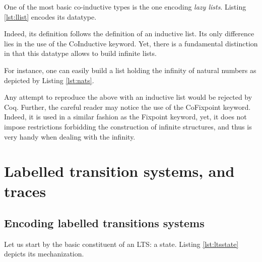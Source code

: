 	One of the most basic co-inductive types is the one encoding \textit{lazy lists}. Listing \ref{lst:llist}
	encodes its datatype.
	
				
	
	\noindent Indeed, its definition follows the definition of an inductive list.	
	Its only difference lies in the use of the \textsf{CoInductive} keyword.
	Yet, there is a fundamental distinction in that this datatype allows to build
	infinite lists.
	
		For instance, one can easily build a list holding the infinity of natural numbers as
	depicted by Listing \ref{lst:nats}.
	
	
					
	
	\noindent Any attempt to reproduce the above with an inductive list would be rejected by
	Coq. Further, the careful reader may notice the use of the \textsf{CoFixpoint} keyword. Indeed,
	it is used in a similar fashion as the \textsf{Fixpoint} keyword, yet, it does not impose
	restrictions forbidding the construction of infinite structures, and thus is very handy when dealing
	with the infinity.



\section{Labelled transition systems, and traces}
\label{sec:pLTS}

\subsection{Encoding labelled transitions systems}
\label{sub:lts}
	
	Let us start by the basic constituent of an \ac{LTS}: a state. Listing \ref{lst:ltsstate} depicts
	its mechanization.	
	
		
	
